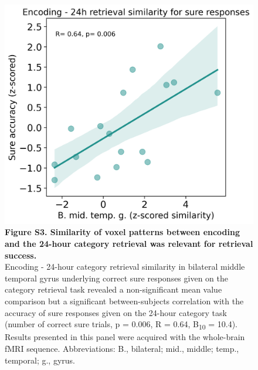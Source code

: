  \begin{figure}[!ht]
    \centering
     \includegraphics[width=0.6\linewidth]{paper/src/figures/20240530_wb-array_n__enc_ret2_perm_consc_consc-unconsc_incorr_B. mid. temp. g._ERS_correl.png}
     \caption*{\textbf{Figure S3. Similarity of voxel patterns between encoding and the 24-hour category retrieval was relevant for retrieval success.} \\ \vspace{0.5em}
   Encoding - 24-hour category retrieval similarity in bilateral middle temporal gyrus underlying correct sure responses given on the category retrieval task revealed a non-significant mean value comparison but a significant between-subjects correlation with the accuracy of sure responses given on the 24-hour category task (number of correct sure trials, p = 0.006, R = 0.64, B\textsubscript{10} = 10.4). Results presented in this panel were acquired with the whole-brain fMRI sequence. Abbreviations: B., bilateral; mid., middle; temp., temporal; g., gyrus.}
\end{figure}

\newpage

